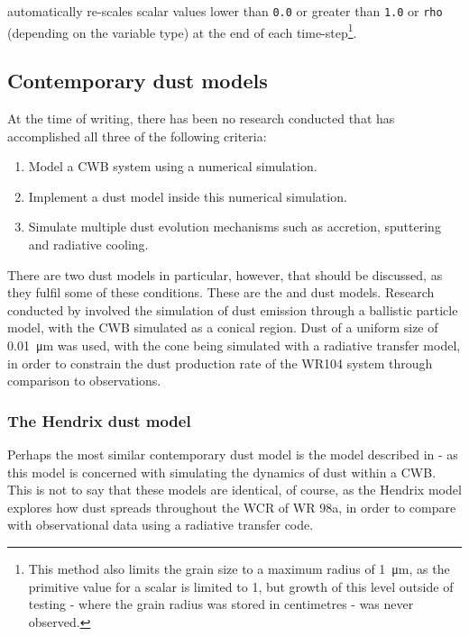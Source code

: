 \noindent
\athena{} automatically re-scales scalar values lower than \texttt{0.0} or greater than \texttt{1.0} or \texttt{rho} (depending on the variable type) at the end of each time-step\footnote{This method also limits the grain size to a maximum radius of \SI{1}{\micro\metre}, as the primitive value for a scalar is limited to 1, but growth of this level outside of testing - where the grain radius was stored in centimetres - was never observed.}.

\subsection{Contemporary dust models}

At the time of writing, there has been no research conducted that has accomplished all three of the following criteria:

\begin{enumerate}
  \item Model a CWB system using a numerical simulation.
  \item Implement a dust model inside this numerical simulation.
  \item Simulate multiple dust evolution mechanisms such as accretion, sputtering and radiative cooling.
\end{enumerate}

\noindent
There are two dust models in particular, however, that should be discussed, as they fulfil some of these conditions.
These are the \textcite{harriesThreedimensionalDustRadiativetransfer2004} and \textcite{hendrix_pinwheels_2016} dust models.
Research conducted by \textcite{harriesThreedimensionalDustRadiativetransfer2004} involved the simulation of dust emission through a ballistic particle model, with the CWB simulated as a conical region.
Dust of a uniform size of \SI{0.01}{\micro\metre} was used, with the cone being simulated with a radiative transfer model, in order to constrain the dust production rate of the WR104 system through comparison to observations.

\subsubsection{The Hendrix dust model}
\label{sec:hendrixmodel}

Perhaps the most similar contemporary dust model is the model described in \textcite{hendrix_pinwheels_2016} - as this model is concerned with simulating the dynamics of dust within a CWB.
This is not to say that these models are identical, of course, as the Hendrix model explores how dust spreads throughout the WCR of WR 98a, in order to compare with observational data using a radiative transfer code.

